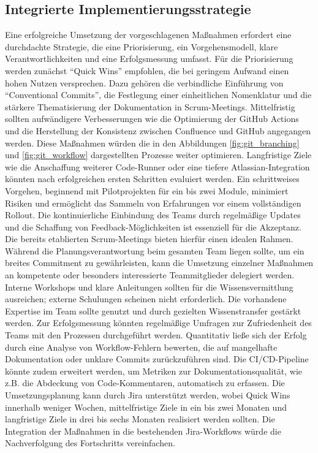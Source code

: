\documentclass[12pt,oneside]{article}
\begin{document}
    \subsection{Integrierte Implementierungsstrategie}
    \label{subsec:integration}
    Eine erfolgreiche Umsetzung der vorgeschlagenen Maßnahmen erfordert eine durchdachte Strategie, die eine Priorisierung, ein Vorgehensmodell, klare Verantwortlichkeiten und eine Erfolgsmessung umfasst.
    \newline
    Für die Priorisierung werden zunächst ``Quick Wins'' empfohlen, die bei geringem Aufwand einen hohen Nutzen versprechen. Dazu gehören die verbindliche Einführung von ``Conventional Commits'', die Festlegung einer einheitlichen Nomenklatur und die stärkere Thematisierung der Dokumentation in Scrum-Meetings. Mittelfristig sollten aufwändigere Verbesserungen wie die Optimierung der GitHub Actions und die Herstellung der Konsistenz zwischen Confluence und GitHub angegangen werden. Diese Maßnahmen würden die in den Abbildungen \ref{fig:git_branching} und \ref{fig:git_workflow} dargestellten Prozesse weiter optimieren. Langfristige Ziele wie die Anschaffung weiterer Code-Runner oder eine tiefere Atlassian-Integration könnten nach erfolgreichen ersten Schritten evaluiert werden.
    \newline
    Ein schrittweises Vorgehen, beginnend mit Pilotprojekten für ein bis zwei Module, minimiert Risiken und ermöglicht das Sammeln von Erfahrungen vor einem vollständigen Rollout. Die kontinuierliche Einbindung des Teams durch regelmäßige Updates und die Schaffung von Feedback-Möglichkeiten ist essenziell für die Akzeptanz. Die bereits etablierten Scrum-Meetings bieten hierfür einen idealen Rahmen.
    \newline
    Während die Planungsverantwortung beim gesamten Team liegen sollte, um ein breites Commitment zu gewährleisten, kann die Umsetzung einzelner Maßnahmen an kompetente oder besonders interessierte Teammitglieder delegiert werden. Interne Workshops und klare Anleitungen sollten für die Wissensvermittlung ausreichen; externe Schulungen scheinen nicht erforderlich. Die vorhandene Expertise im Team sollte genutzt und durch gezielten Wissenstransfer gestärkt werden.
    \newline
    Zur Erfolgsmessung könnten regelmäßige Umfragen zur Zufriedenheit des Teams mit den Prozessen durchgeführt werden. Quantitativ ließe sich der Erfolg durch eine Analyse von Workflow-Fehlern bewerten, die auf mangelhafte Dokumentation oder unklare Commits zurückzuführen sind. Die CI/CD-Pipeline könnte zudem erweitert werden, um Metriken zur Dokumentationsqualität, wie z.B. die Abdeckung von Code-Kommentaren, automatisch zu erfassen.
    \newline
    Die Umsetzungsplanung kann durch Jira unterstützt werden, wobei Quick Wins innerhalb weniger Wochen, mittelfristige Ziele in ein bis zwei Monaten und langfristige Ziele in drei bis sechs Monaten realisiert werden sollten. Die Integration der Maßnahmen in die bestehenden Jira-Workflows würde die Nachverfolgung des Fortschritts vereinfachen.
\end{document}
